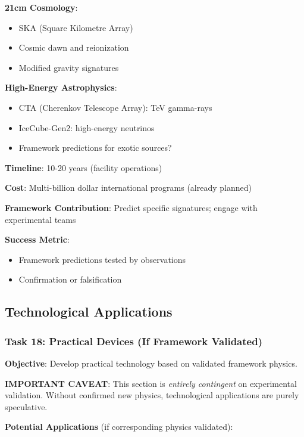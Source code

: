 \textbf{21cm Cosmology}:
\begin{itemize}
    \item SKA (Square Kilometre Array)
    \item Cosmic dawn and reionization
    \item Modified gravity signatures
\end{itemize}

\textbf{High-Energy Astrophysics}:
\begin{itemize}
    \item CTA (Cherenkov Telescope Array): TeV gamma-rays
    \item IceCube-Gen2: high-energy neutrinos
    \item Framework predictions for exotic sources?
\end{itemize}

\textbf{Timeline}: 10-20 years (facility operations)

\textbf{Cost}: Multi-billion dollar international programs (already planned)

\textbf{Framework Contribution}: Predict specific signatures; engage with experimental teams

\textbf{Success Metric}:
\begin{itemize}
    \item Framework predictions tested by observations
    \item Confirmation or falsification
\end{itemize}

\subsection{Technological Applications}

\subsubsection{Task 18: Practical Devices (If Framework Validated)}

\textbf{Objective}: Develop practical technology based on validated framework physics.

\textbf{IMPORTANT CAVEAT}: This section is \textit{entirely contingent} on experimental validation. Without confirmed new physics, technological applications are purely speculative.

\textbf{Potential Applications} (if corresponding physics validated):

